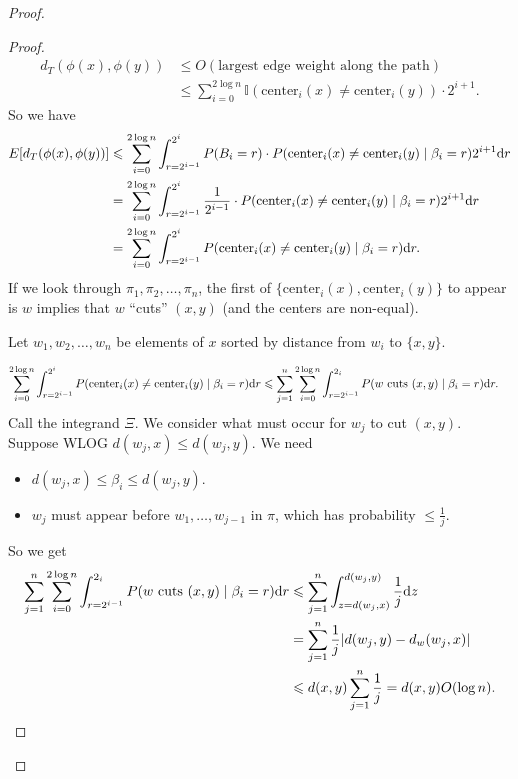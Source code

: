 \documentclass{report}
\begin{document}
\begin{proof}
    \begin{proof}
        \begin{align*}
            d_T(\phi(x), \phi(y)) &\leq O(\text{largest edge weight along the path}) \\
            &\leq \sum_{i=0}^{2\log n} \mathbb I (\text{center}_i(x) \neq \text{center}_i(y)) \cdot 2^{i+1}.
        \end{align*}
        \newpage
        So we have 
        \begin{align*}
            E[d_T(\phi(x), \phi(y))] &\leq \sum_{i=0}^{2 \log n} \int_{r = 2^{i-1}}^{2^i} P(B_i = r) \cdot P(\text{center}_i(x) \neq \text{center}_i(y) \mid \beta_i = r) 2^{i+1} \text dr \\
            &=  \sum_{i=0}^{2 \log n} \int_{r = 2^{i-1}}^{2^i} \frac{1}{2^{i-1}} \cdot P(\text{center}_i(x) \neq \text{center}_i(y) \mid \beta_i = r) 2^{i+1} \text dr \\
            &=  \sum_{i=0}^{2 \log n} \int_{r = 2^{i-1}}^{2^i}  P(\text{center}_i(x) \neq \text{center}_i(y) \mid \beta_i = r) \text dr.
        \end{align*}
        If we look through $\pi_1, \pi_2, \ldots, \pi_n$, the first of $\{\text{center}_i(x), \text{center}_i(y)\}$ to appear is $w$ implies that $w$ ``cuts'' $(x, y)$ (and the centers are non-equal).

        Let $w_1, w_2, \ldots, w_n$ be elements of $x$ sorted by distance from $w_i$ to $\{x, y\}$. 

        \begin{align*}
            \sum_{i=0}^{2 \log n} \int_{r = 2^{i-1}}^{2^i}  P(\text{center}_i(x) \neq \text{center}_i(y) \mid \beta_i = r) \text dr &\leq \sum_{j=1}^n \sum_{i=0}^{2 \log n} \int_{r = 2^{i-1}}^{2_i} P(w \text{ cuts } (x, y) \mid \beta_i = r) \text dr.
        \end{align*}
        Call the integrand $\Xi$. We consider what must occur for $w_j$ to cut $(x, y)$. Suppose WLOG $d(w_j, x) \leq d(w_j, y)$. We need 
        \begin{itemize}
            \item $d(w_j, x) \leq \beta_i \leq d(w_j, y)$.
            \item $w_j$ must appear before $w_1, \ldots, w_{j-1}$ in $\pi$, which has probability $\leq \frac 1j$. 
        \end{itemize}
        So we get 
        \begin{align*}
            \sum_{j=1}^n \sum_{i=0}^{2 \log n} \int_{r = 2^{i-1}}^{2_i} P(w \text{ cuts } (x, y) \mid \beta_i = r) \text dr &\leq \sum_{j=1}^n \int_{z = d(w_j, x)}^{d(w_j, y)} \frac 1j \text dz \\
            &= \sum_{j=1}^n \frac 1j |d(w_j, y) - d_w(w_j, x)| \\
            &\leq d(x, y) \sum_{j=1}^n \frac 1j = d(x, y) O(\log n).
        \end{align*}
    \end{proof}
    
\end{proof}
\newpage
\end{document}
